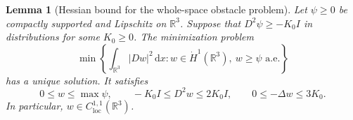 \documentclass[11pt,a4paper,reqno]{amsart}
\theoremstyle{plain}
\newtheorem{lemma}[theorem]{Lemma}
\theoremstyle{remark}
\numberwithin{equation}{section}
\newcommand{\R}{\mathbb R}
\newcommand{\dd}{\,\mathrm d}
\begin{document}
\begin{lemma}[Hessian bound for the whole-space obstacle problem]\label{lem:obstacle}
Let $\psi\ge0$ be compactly supported and Lipschitz on $\R^3$. Suppose that $D^2\psi\ge-K_0I$ in distributions for some $K_0\ge0$. The minimization problem
\begin{equation}\label{eq:obstacle-minimization}
 \min\left\{\int_{\R^3}|Dw|^2\dd x:
                  w\in\dot H^1(\R^3),\ w\ge\psi\text{ a.e.}\right\}
\end{equation}
has a unique solution. It satisfies
\begin{equation}\label{eq:obstacle-estimates}
 0\le w\le\max\psi,\qquad
 -K_0I\le D^2w\le2K_0I,\qquad 0\le-\Delta w\le3K_0.
\end{equation}
In particular, $w\in C^{1,1}_{\mathrm{loc}}(\R^3)$.
\end{lemma}
\end{document}
